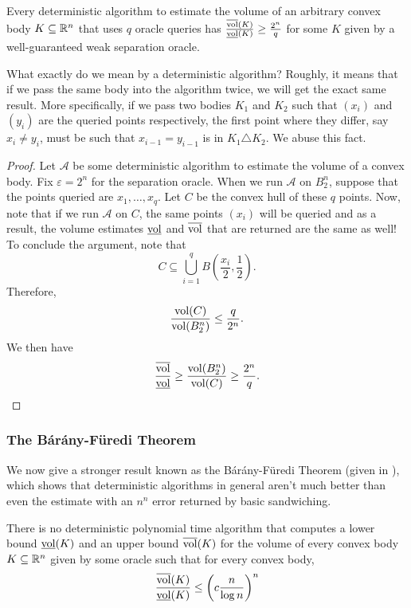 \begin{lemma}
Every deterministic algorithm to estimate the volume of an arbitrary convex body $K\subseteq\mathbb{R}^n$ that uses $q$ oracle queries has $\frac{\overline{\operatorname{vol}}(K)}{\underline{\operatorname{vol}}(K)} \geq \frac{2^n}{q}$ for some $K$ given by a well-guaranteed weak separation oracle.
\end{lemma}

What exactly do we mean by a deterministic algorithm? Roughly, it means that if we pass the same body into the algorithm twice, we will get the exact same result. More specifically, if we pass two bodies $K_1$ and $K_2$ such that $(x_i)$ and $(y_i)$ are the queried points respectively, the first point where they differ, say $x_i\neq y_i$, must be such that $x_{i-1}=y_{i-1}$ is in $K_1\triangle K_2$. We abuse this fact.

\begin{proof}
Let $\mathcal{A}$ be some deterministic algorithm to estimate the volume of a convex body. Fix $\varepsilon=2^n$ for the separation oracle. When we run $\mathcal{A}$ on $B_2^n$, suppose that the points queried are $x_1,\ldots,x_q$. Let $C$ be the convex hull of these $q$ points. Now, note that if we run $\mathcal{A}$ on $C$, the same points $(x_i)$ will be queried and as a result, the volume estimates $\underline{\operatorname{vol}}$ and $\overline{\operatorname{vol}}$ that are returned are the same as well!\\
To conclude the argument, note that
\[ C \subseteq \bigcup_{i=1}^q B\left(\frac{x_i}{2},\frac{1}{2}\right). \]
Therefore,
\[ \frac{\operatorname{vol}(C)}{\operatorname{vol}(B_2^n)} \leq \frac{q}{2^n}. \]
We then have
\[ \frac{\overline{\operatorname{vol}}}{\underline{\operatorname{vol}}} \geq \frac{\operatorname{vol}(B_2^n)}{\operatorname{vol}(C)} \geq \frac{2^n}{q}. \]
\end{proof}

\subsubsection{The B\'ar\'any-F\"uredi Theorem}

We now give a stronger result known as the B\'ar\'any-F\"uredi Theorem (given in \cite{no-deterministic-algo-barany-furedi}), which shows that deterministic algorithms in general aren't much better than even the estimate with an $n^n$ error returned by basic sandwiching.

\begin{ftheo}
There is no deterministic polynomial time algorithm that computes a lower bound $\underline{\operatorname{vol}}(K)$ and an upper bound $\overline{\operatorname{vol}}(K)$ for the volume of every convex body $K\subseteq\mathbb{R}^n$ given by some oracle such that for every convex body,
\[ \frac{\overline{\operatorname{vol}}(K)}{\underline{\operatorname{vol}}(K)} \leq \left(c \frac{n}{\log n}\right)^n \]
\end{ftheo}


